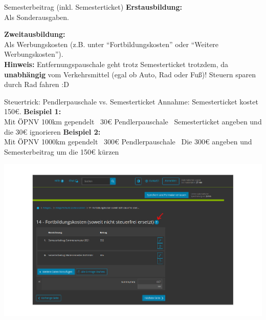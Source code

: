 \documentclass{beamer}
\begin{document}
			\begin{frame}{Semesterbeitrag (inkl. Semesterticket)}
				\textbf{Erstausbildung:}\\
				Als Sonderausgaben.\n
				
				\textbf{Zweitausbildung:}\\
				Als Werbungskosten (z.B. unter "`Fortbildungskosten"' oder "`Weitere Werbungskosten"').\n
				\hfill\\\pause
				\textbf{Hinweis:} Entfernungspauschale geht trotz Semesterticket trotzdem, da \textbf{unabhängig} vom Verkehrsmittel (egal ob Auto, Rad oder Fuß)! Steuern sparen durch Rad fahren :D\n\pause
			\end{frame}
		
			\begin{frame}{Steuertrick: Pendlerpauschale vs. Semesterticket}
				Annahme: Semesterticket kostet 150€.\n
				\textbf{Beispiel 1:}\\
				Mit ÖPNV 100km gependelt \textrightarrow\ 30€ Pendlerpauschale \textrightarrow\ Semesterticket angeben und die 30€ ignorieren\n
				\textbf{Beispiel 2:}\\
				Mit ÖPNV 1000km gependelt \textrightarrow\ 300€ Pendlerpauschale \textrightarrow\ Die 300€ angeben und Semesterbeitrag um die 150€ kürzen
			\end{frame}
		
			\begin{frame}
				\begin{center}
					\vspace{-0.6cm}
					\hspace*{-0.91cm}
					\includegraphics[scale=0.24]{images/elster-fortbildungskosten-1}
				\end{center}
			\end{frame}
			
\end{document}
